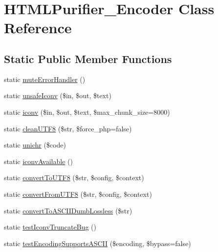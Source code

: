 \hypertarget{classHTMLPurifier__Encoder}{\section{H\+T\+M\+L\+Purifier\+\_\+\+Encoder Class Reference}
\label{classHTMLPurifier__Encoder}
}
\subsection*{Static Public Member Functions}
\begin{DoxyCompactItemize}
\item 
static \hyperlink{classHTMLPurifier__Encoder_a8daf61530ad6f5219b3a2f2ec6d4de32}{mute\+Error\+Handler} ()
\item 
static \hyperlink{classHTMLPurifier__Encoder_ae177bdf5de75fd487d55fa87568366c8}{unsafe\+Iconv} (\$in, \$out, \$text)
\item 
static \hyperlink{classHTMLPurifier__Encoder_a149d8038f81dcd50f70598067b4444d8}{iconv} (\$in, \$out, \$text, \$max\+\_\+chunk\+\_\+size=8000)
\item 
static \hyperlink{classHTMLPurifier__Encoder_a4903a5cfecda1c255647e87106cc686b}{clean\+U\+T\+F8} (\$str, \$force\+\_\+php=false)
\item 
static \hyperlink{classHTMLPurifier__Encoder_a1ce3abe9bf916a9ec35014f23255a408}{unichr} (\$code)
\item 
static \hyperlink{classHTMLPurifier__Encoder_ac9526f4471531a5455e5f0e560349226}{iconv\+Available} ()
\item 
static \hyperlink{classHTMLPurifier__Encoder_a6876fc3fbf0ae1ce1d06bd127fb55886}{convert\+To\+U\+T\+F8} (\$str, \$config, \$context)
\item 
static \hyperlink{classHTMLPurifier__Encoder_a48bca7ecbdec1fde428a95fc2ec8fff9}{convert\+From\+U\+T\+F8} (\$str, \$config, \$context)
\item 
static \hyperlink{classHTMLPurifier__Encoder_a60bc1be93b691bc03b1205103c839f7b}{convert\+To\+A\+S\+C\+I\+I\+Dumb\+Lossless} (\$str)
\item 
static \hyperlink{classHTMLPurifier__Encoder_ad491b38d38ff9d9cdb6ea7d67a841de2}{test\+Iconv\+Truncate\+Bug} ()
\item 
static \hyperlink{classHTMLPurifier__Encoder_a7b50502a5abcacf711adb0f3b6bbcfb2}{test\+Encoding\+Supports\+A\+S\+C\+I\+I} (\$encoding, \$bypass=false)
\end{DoxyCompactItemize}
